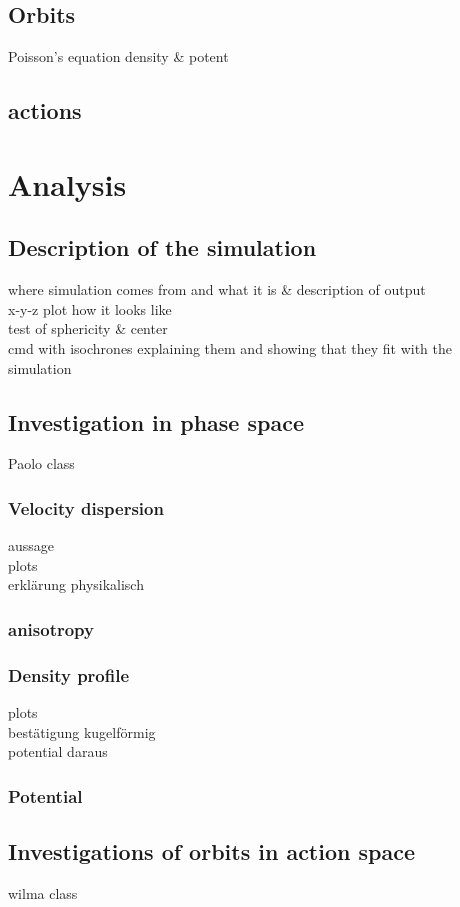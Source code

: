 \documentclass[a4paper,12pt,abstracton]{scrartcl}
\begin{document}
\subsection{Orbits}
Poisson's equation
density \& potent
\subsection{actions}
\newpage
\section{Analysis}

\subsection{Description of the simulation}
where simulation comes from and what it is \& description of output\\
x-y-z plot how it looks like\\
test of sphericity \& center\\
cmd with isochrones explaining them and showing that they fit with the simulation\\

\subsection{Investigation in phase space}
Paolo class

\subsubsection{Velocity dispersion}
aussage\\
plots\\
erklärung physikalisch
\subsubsection{anisotropy}
\subsubsection{Density profile}
plots\\
bestätigung kugelförmig\\
potential daraus
\subsubsection{Potential}

\subsection{Investigations of orbits in action space}
wilma class 
\end{document}
